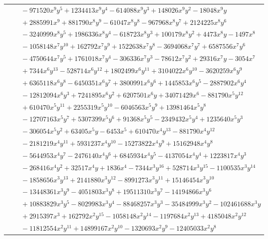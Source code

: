 \documentclass[11pt]{article}
\begin{document}
\begin{longtable}{@{}ll@{}}
 & $\quad -971520x^{9}y^{5}+1234413x^{9}y^{4}-614088x^{9}y^{3}+148026x^{9}y^{2}-18048x^{9}y$\\
 & $\quad +2885991x^{9}+881790x^{8}y^{9}-61047x^{8}y^{8}-967968x^{8}y^{7}+2124225x^{8}y^{6}$\\
 & $\quad -3240999x^{8}y^{5}+1986336x^{8}y^{4}-618723x^{8}y^{3}+100179x^{8}y^{2}+4473x^{8}y-1497x^{8}$\\
 & $\quad -1058148x^{7}y^{10}+162792x^{7}y^{9}+1522638x^{7}y^{8}-3694068x^{7}y^{7}+6587556x^{7}y^{6}$\\
 & $\quad -4750644x^{7}y^{5}+1761018x^{7}y^{4}-306336x^{7}y^{3}-78612x^{7}y^{2}+29316x^{7}y-3054x^{7}$\\
 & $\quad +7344x^{6}y^{13}-528714x^{6}y^{12}+1802499x^{6}y^{11}+3104022x^{6}y^{10}-3620259x^{6}y^{9}$\\
 & $\quad +6365118x^{6}y^{8}-6450351x^{6}y^{7}+3800991x^{6}y^{6}+1445853x^{6}y^{5}-2887902x^{6}y^{4}$\\
 & $\quad -12812094x^{6}y^{3}+7241895x^{6}y^{2}+6207501x^{6}y+34071429x^{6}-881790x^{5}y^{12}$\\
 & $\quad +610470x^{5}y^{11}+2255319x^{5}y^{10}-6046563x^{5}y^{9}+13981464x^{5}y^{8}$\\
 & $\quad -12707163x^{5}y^{7}+5307399x^{5}y^{6}+91368x^{5}y^{5}-2349432x^{5}y^{4}+1235640x^{5}y^{3}$\\
 & $\quad -306054x^{5}y^{2}+63405x^{5}y-6453x^{5}+610470x^{4}y^{13}-881790x^{4}y^{12}$\\
 & $\quad -2181219x^{4}y^{11}+5931237x^{4}y^{10}-15273822x^{4}y^{9}+15162948x^{4}y^{8}$\\
 & $\quad -5644953x^{4}y^{7}-2476140x^{4}y^{6}+6845934x^{4}y^{5}-4137054x^{4}y^{4}+1223817x^{4}y^{3}$\\
 & $\quad -268416x^{4}y^{2}+32517x^{4}y+1836x^{4}-7344x^{3}y^{16}+528714x^{3}y^{15}-1100535x^{3}y^{14}$\\
 & $\quad -1858656x^{3}y^{13}+2141880x^{3}y^{12}-8991273x^{3}y^{11}+15146454x^{3}y^{10}$\\
 & $\quad -13448361x^{3}y^{9}-4051803x^{3}y^{8}+19511310x^{3}y^{7}-14194866x^{3}y^{6}$\\
 & $\quad +10883829x^{3}y^{5}-8029983x^{3}y^{4}-88468257x^{3}y^{3}-35484999x^{3}y^{2}-102461688x^{3}y$\\
 & $\quad +2915397x^{3}+162792x^{2}y^{15}-1058148x^{2}y^{14}-1197684x^{2}y^{13}+4185048x^{2}y^{12}$\\
 & $\quad -11812554x^{2}y^{11}+14899167x^{2}y^{10}-1320693x^{2}y^{9}-12405033x^{2}y^{8}$\\

\end{longtable}
\end{document}
